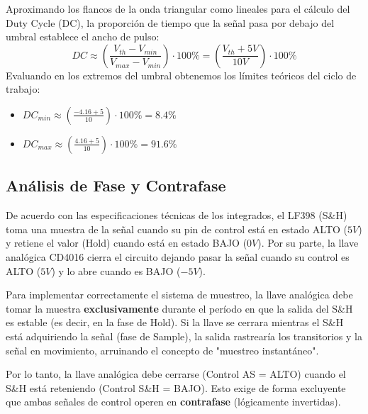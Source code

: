 Aproximando los flancos de la onda triangular como lineales para el cálculo del Duty Cycle (DC), la proporción de tiempo que la señal pasa por debajo del umbral establece el ancho de pulso:
\begin{equation}
	DC \approx \left( \frac{V_{th} - V_{min}}{V_{max} - V_{min}} \right) \cdot 100\% = \left( \frac{V_{th} + 5V}{10V} \right) \cdot 100\%
\end{equation}
Evaluando en los extremos del umbral obtenemos los límites teóricos del ciclo de trabajo:
\begin{itemize}
	\item $DC_{min} \approx \left( \frac{-4.16 + 5}{10} \right) \cdot 100\% = \mathbf{8.4\%}$
	\item $DC_{max} \approx \left( \frac{4.16 + 5}{10} \right) \cdot 100\% = \mathbf{91.6\%}$
\end{itemize}
\newpage
\subsection{Análisis de Fase y Contrafase}
De acuerdo con las especificaciones técnicas de los integrados, el LF398 (S\&H) toma una muestra de la señal cuando su pin de control está en estado ALTO ($5V$) y retiene el valor (Hold) cuando está en estado BAJO ($0V$). Por su parte, la llave analógica CD4016 cierra el circuito dejando pasar la señal cuando su control es ALTO ($5V$) y lo abre cuando es BAJO ($-5V$).

Para implementar correctamente el sistema de muestreo, la llave analógica debe tomar la muestra \textbf{exclusivamente} durante el período en que la salida del S\&H es estable (es decir, en la fase de Hold). Si la llave se cerrara mientras el S\&H está adquiriendo la señal (fase de Sample), la salida rastrearía los transitorios y la señal en movimiento, arruinando el concepto de "muestreo instantáneo".

Por lo tanto, la llave analógica debe cerrarse (Control AS = ALTO) cuando el S\&H está reteniendo (Control S\&H = BAJO). Esto exige de forma excluyente que ambas señales de control operen en \textbf{contrafase} (lógicamente invertidas).


